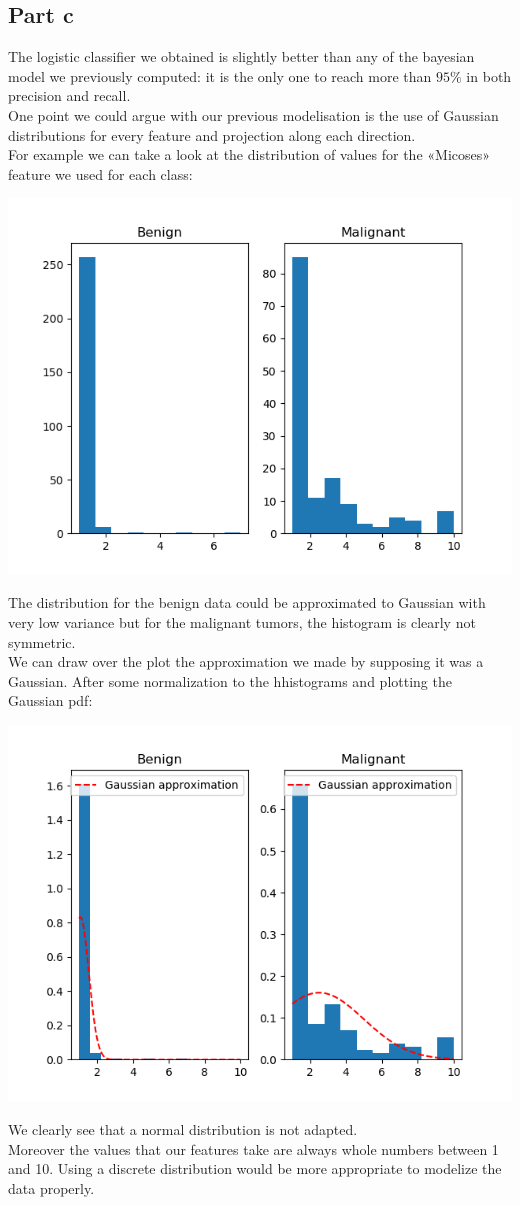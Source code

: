 \documentclass[a4paper, 10pt]{article}
\begin{document}
\subsection{Part c}
The logistic classifier we obtained is slightly better than any of the bayesian model we previously computed:
it is the only one to reach more than $95\%$ in both precision and recall.
\\
One point we could argue with our previous modelisation is the use of Gaussian distributions for every feature
and projection along each direction.
\\
For example we can take a look at the distribution of values for the «Micoses» feature we used for each class:
\begin{center}
   \includegraphics[scale=0.7]{micoses} 
\end{center}
The distribution for the benign data could be approximated to Gaussian with very low variance but
for the malignant tumors, the histogram is clearly not symmetric.
\\
We can draw over the plot the approximation we made by supposing it was a Gaussian. After some normalization
to the hhistograms and plotting the Gaussian pdf:
\begin{center}
    \includegraphics[scale=0.7]{micoses_gauss}
\end{center}
We clearly see that a normal distribution is not adapted.
\\
Moreover the values that our features take are always whole numbers between 1 and 10. Using a discrete
distribution would be more appropriate to modelize the data properly.
\end{document}
